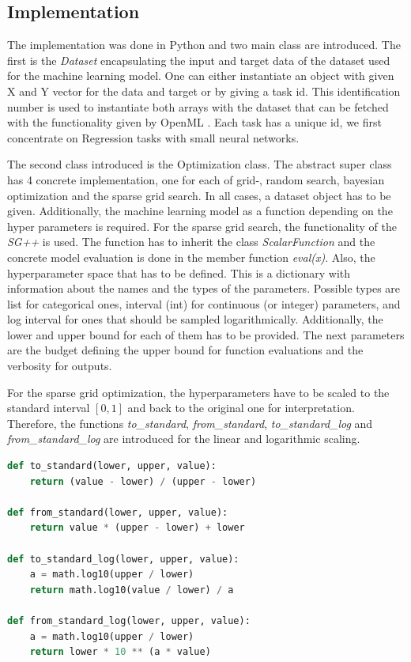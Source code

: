 \subsection{Implementation}
\label{subsec:Implementation}

The implementation was done in Python and two main class are introduced. The first is the \textit{Dataset} encapsulating the input and target data of the dataset used for the machine learning model. One can either instantiate an object with given X and Y vector for the data and target or by giving a task id. This identification number is used to instantiate both arrays with the dataset that can be fetched with the functionality given by OpenML \cite{feurer-arxiv19a}. Each task has a unique id, we first concentrate on Regression tasks with small neural networks. \newline

The second class introduced is the Optimization class. The abstract super class has 4 concrete implementation, one for each of grid-, random search, bayesian optimization and the sparse grid search. In all cases, a dataset object has to be given. Additionally, the machine learning model as a function depending on the hyper parameters is required. For the sparse grid search, the functionality of the \textit{SG++} \cite{valentin2016hierarchical} is used. The function has to inherit the class \textit{ScalarFunction} and the concrete model evaluation is done in the member function \textit{eval(x)}. Also, the hyperparameter space that has to be defined. This is a dictionary with information about the names and the types of the parameters. Possible types are list for categorical ones, interval (int) for continuous (or integer) parameters, and log interval for ones that should be sampled logarithmically. Additionally, the lower and upper bound for each of them has to be provided. The next parameters are the budget defining the upper bound for function evaluations and the verbosity for outputs. \newline

For the sparse grid optimization, the hyperparameters have to be scaled to the standard interval $ [0,1] $ and back to the original one for interpretation. Therefore, the functions \textit{to\_standard}, \textit{from\_standard}, \textit{to\_standard\_log} and \textit{from\_standard\_log} are introduced for the linear and logarithmic scaling. 

\begin{lstlisting}[language=Python]
def to_standard(lower, upper, value):
	return (value - lower) / (upper - lower)
	
def from_standard(lower, upper, value):
	return value * (upper - lower) + lower
	
def to_standard_log(lower, upper, value):
	a = math.log10(upper / lower)
	return math.log10(value / lower) / a	
	
def from_standard_log(lower, upper, value):
	a = math.log10(upper / lower)
	return lower * 10 ** (a * value)
\end{lstlisting}

